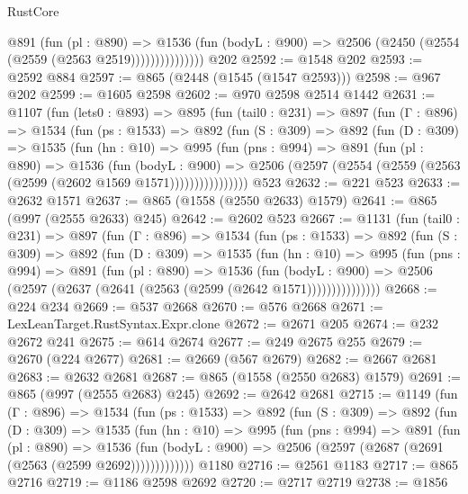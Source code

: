 \begin{lexlean}{RustCore}
\begin{coremodule}
{\begin{coremodule}
{{{{{{{{                    @891
                      (fun (pl : @890) =>
                      @1536
                        (fun (bodyL : @900) =>
                        @2506 (@2450 (@2554 (@2559 (@2563 @2519)))))))))))))))
    @202
@2592 := @1548 @202
@2593 := @2592 @884
@2597 := @865 (@2448 (@1545 (@1547 @2593)))
@2598 := @967 @202
@2599 := @1605 @2598
@2602 := @970 @2598 @2514 @1442
@2631 := @1107
    (fun (lets0 : @893) =>
    @895
      (fun (tail0 : @231) =>
      @897
        (fun (Γ : @896) =>
        @1534
          (fun (ps : @1533) =>
          @892
            (fun (S : @309) =>
            @892
              (fun (D : @309) =>
              @1535
                (fun (hn : @10) =>
                @995
                  (fun (pns : @994) =>
                  @891
                    (fun (pl : @890) =>
                    @1536
                      (fun (bodyL : @900) =>
                      @2506 (@2597 (@2554 (@2559 (@2563 (@2599 (@2602 @1569 @1571))))))))))))))))
    @523
@2632 := @221 @523
@2633 := @2632 @1571
@2637 := @865 (@1558 (@2550 @2633) @1579)
@2641 := @865 (@997 (@2555 @2633) @245)
@2642 := @2602 @523
@2667 := @1131
    (fun (tail0 : @231) =>
    @897
      (fun (Γ : @896) =>
      @1534
        (fun (ps : @1533) =>
        @892
          (fun (S : @309) =>
          @892
            (fun (D : @309) =>
            @1535
              (fun (hn : @10) =>
              @995
                (fun (pns : @994) =>
                @891
                  (fun (pl : @890) =>
                  @1536
                    (fun (bodyL : @900) =>
                    @2506 (@2597 (@2637 (@2641 (@2563 (@2599 (@2642 @1571)))))))))))))))
@2668 := @224 @234
@2669 := @537 @2668
@2670 := @576 @2668
@2671 := LexLeanTarget.RustSyntax.Expr.clone
@2672 := @2671 @205
@2674 := @232 @2672 @241
@2675 := @614 @2674
@2677 := @249 @2675 @255
@2679 := @2670 (@224 @2677)
@2681 := @2669 (@567 @2679)
@2682 := @2667 @2681
@2683 := @2632 @2681
@2687 := @865 (@1558 (@2550 @2683) @1579)
@2691 := @865 (@997 (@2555 @2683) @245)
@2692 := @2642 @2681
@2715 := @1149
    (fun (Γ : @896) =>
    @1534
      (fun (ps : @1533) =>
      @892
        (fun (S : @309) =>
        @892
          (fun (D : @309) =>
          @1535
            (fun (hn : @10) =>
            @995
              (fun (pns : @994) =>
              @891
                (fun (pl : @890) =>
                @1536
                  (fun (bodyL : @900) => @2506 (@2597 (@2687 (@2691 (@2563 (@2599 @2692)))))))))))))
    @1180
@2716 := @2561 @1183
@2717 := @865 @2716
@2719 := @1186 @2598 @2692
@2720 := @2717 @2719
@2738 := @1856
}}}}}}}}
\end{coremodule}}
\end{coremodule}
\end{lexlean}
